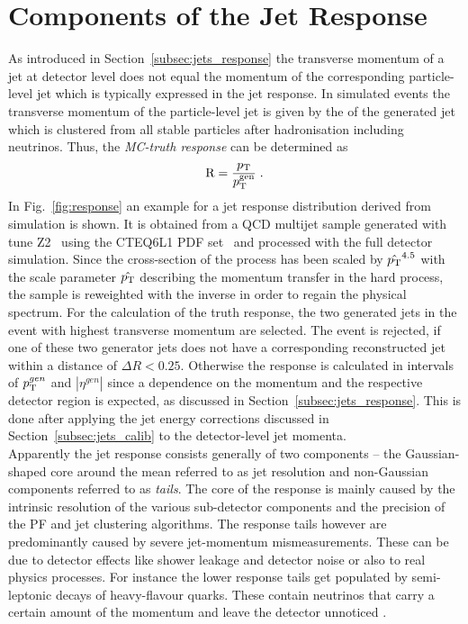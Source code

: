 \section{Components of the Jet Response}
\label{sec:jer_response}
As introduced in Section~\ref{subsec:jets_response} the transverse momentum of a jet at detector level does not equal the momentum of the corresponding particle-level jet which is typically expressed in the jet response. In simulated events the transverse momentum of the particle-level jet is given by the \pt of the generated jet which is clustered from all stable particles after hadronisation including neutrinos. Thus, the \textit{MC-truth response} can be determined as
\begin{equation}
\mathrm{R} = \frac{p_{\text{T}}}{p_{\text{T}}^{\mathrm{gen}}} \; .
\end{equation}
 In Fig.~\ref{fig:response} an example for a jet response distribution derived from simulation is shown. It is obtained from a QCD multijet sample generated with  tune Z2~\cite{Chatrchyan:2011id} using the CTEQ6L1 PDF set~\cite{Pumplin:2002vw} and processed with the full detector simulation. Since the cross-section of the process has been scaled by $\hat{p_{\text{T}}}^{4.5}$ with the scale parameter $\hat{p_{\text{T}}}$ describing the momentum transfer in the hard process, the sample is reweighted with the inverse in order to regain the physical spectrum. For the calculation of the truth response, the two generated jets in the event with highest transverse momentum are selected. The event is rejected, if one of these two generator jets does not have a corresponding reconstructed jet within a distance of $\Delta R < 0.25$. Otherwise the response is calculated in intervals of $p_{\text{T}}^{gen}$ and $|\eta^{gen}|$  since a dependence on the momentum and the respective detector region is expected, as discussed in Section~\ref{subsec:jets_response}. This is done after applying the jet energy corrections discussed in Section~\ref{subsec:jets_calib} to the detector-level jet momenta. \\
Apparently the jet response consists generally of two components -- the Gaussian-shaped core around the mean referred to as jet resolution and non-Gaussian components referred to as \textit{tails}. The core of the response is mainly caused by the intrinsic resolution of the various sub-detector components and the precision of the PF and jet clustering algorithms. The response tails however are predominantly caused by severe jet-momentum mismeasurements. These can be due to detector effects like shower leakage and detector noise or also to real physics processes. For instance the lower response tails get populated by semi-leptonic decays of heavy-flavour quarks. These contain neutrinos that carry a certain amount of the momentum and leave the detector unnoticed . 
